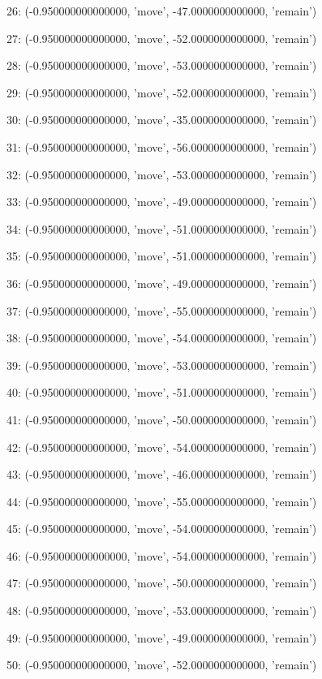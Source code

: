 26: (-0.950000000000000, 'move', -47.0000000000000, 'remain')


27: (-0.950000000000000, 'move', -52.0000000000000, 'remain')


28: (-0.950000000000000, 'move', -53.0000000000000, 'remain')


29: (-0.950000000000000, 'move', -52.0000000000000, 'remain')


30: (-0.950000000000000, 'move', -35.0000000000000, 'remain')


31: (-0.950000000000000, 'move', -56.0000000000000, 'remain')


32: (-0.950000000000000, 'move', -53.0000000000000, 'remain')


33: (-0.950000000000000, 'move', -49.0000000000000, 'remain')


34: (-0.950000000000000, 'move', -51.0000000000000, 'remain')


35: (-0.950000000000000, 'move', -51.0000000000000, 'remain')


36: (-0.950000000000000, 'move', -49.0000000000000, 'remain')


37: (-0.950000000000000, 'move', -55.0000000000000, 'remain')


38: (-0.950000000000000, 'move', -54.0000000000000, 'remain')


39: (-0.950000000000000, 'move', -53.0000000000000, 'remain')


40: (-0.950000000000000, 'move', -51.0000000000000, 'remain')


41: (-0.950000000000000, 'move', -50.0000000000000, 'remain')


42: (-0.950000000000000, 'move', -54.0000000000000, 'remain')


43: (-0.950000000000000, 'move', -46.0000000000000, 'remain')


44: (-0.950000000000000, 'move', -55.0000000000000, 'remain')


45: (-0.950000000000000, 'move', -54.0000000000000, 'remain')


46: (-0.950000000000000, 'move', -54.0000000000000, 'remain')


47: (-0.950000000000000, 'move', -50.0000000000000, 'remain')


48: (-0.950000000000000, 'move', -53.0000000000000, 'remain')


49: (-0.950000000000000, 'move', -49.0000000000000, 'remain')


50: (-0.950000000000000, 'move', -52.0000000000000, 'remain')


